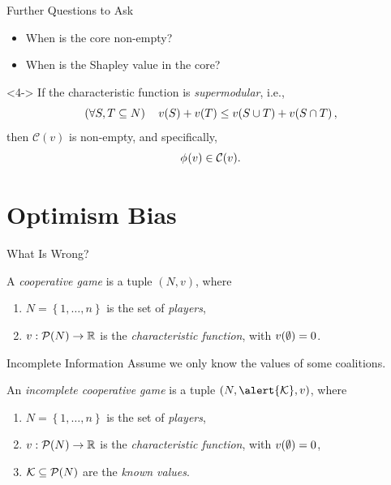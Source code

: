 \documentclass[aspectratio=169]{beamer}
\begin{document}
\begin{frame}{Further Questions to Ask}
	\begin{itemize}[ ]
		\item<2-> When is the core non-empty?
		\item<3-> When is the Shapley value in the core?
	\end{itemize}
	\vspace{1em}
	\begin{theorem}<4->
		If the characteristic function is \emph{supermodular}, i.e., \[
			\left( \forall S,T \subseteq N \right)\quad v\!\left(S\right) + v\!\left(T\right) \leq v\!\left(S \cup T\right) + v\!\left(S \cap T\right),
		\]
		then $ \mathcal{C}(v) $ is non-empty, and specifically, \[
			\phi_{}\!\left(v\right) \in \mathcal{C}(v).
		\]
	\end{theorem}
\end{frame}

\section{Optimism Bias}

\begin{frame}{What Is Wrong?}
	\begin{definition}
		A \emph{cooperative game} is a tuple $ \left( N,v \right) $, where \begin{enumerate}
			\item $ N = \left\{ 1, \ldots, n \right\} $ is the set of \emph{players},
			\item $ v: \mathcal{P}\!\left(N\right) \to \mathbb{R} $ is the \emph{characteristic function}, with $ v\!\left(\emptyset\right) = 0 $.
		\end{enumerate}
	\end{definition}
\end{frame}

\begin{frame}{Incomplete Information}
	Assume we only know the values of some coalitions.
	\vspace{3em}
	\begin{definition}
		An \emph{incomplete cooperative game} is a tuple $ \left( N,\alert{\k},v \right) $, where \begin{enumerate}
			\item $ N = \left\{ 1, \ldots, n \right\} $ is the set of \emph{players},
			\item $ v: \mathcal{P}\!\left(N\right) \to \mathbb{R} $ is the \emph{characteristic function}, with $ v\!\left(\emptyset\right) = 0 $,
			\item \alert{$ \mathcal{K} \subseteq \mathcal{P}\!\left(N\right) $ are the \emph{known values}.}
		\end{enumerate}
	\end{definition}
\end{frame}
\end{document}
